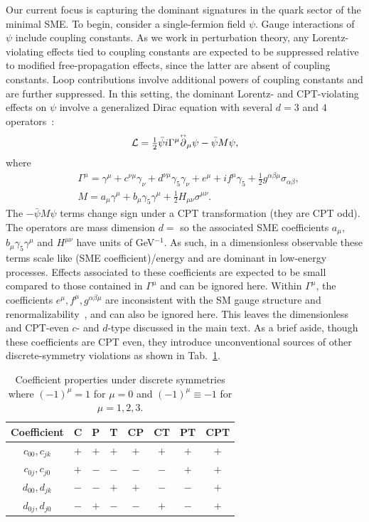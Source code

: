 Our current focus is capturing the dominant 
signatures in the quark sector of the minimal SME.
To begin, consider a single-fermion field $\psi$.
Gauge interactions of $\psi$ include coupling constants.
As we work in perturbation theory, 
any Lorentz-violating effects tied to
coupling constants are expected to be 
suppressed relative to modified free-propagation 
effects, since the latter are absent of coupling 
constants. Loop contributions involve additional
powers of coupling constants and are further
suppressed. In this setting, the dominant
Lorentz- and CPT-violating effects 
on $\psi$ involve a generalized Dirac equation 
with several $d=3$ and $4$ operators~\cite{Colladay:2001wk}:
%
\begin{align}
\label{QEDSME}
\mathcal{L} = \tfrac{1}{2}\bar\psi i\Gamma^\mu \overset{\text{\tiny$\leftrightarrow$}}\partial_\mu\psi - \bar\psi M \psi,
\end{align}
%
where
%
\begin{align}
\label{gammaM}
&\Gamma^\mu = \gamma^\mu + c^{\nu\mu}\gamma_\nu + d^{\nu\mu}\gamma_5\gamma_\nu + e^\mu + if^\mu\gamma_5 + \tfrac{1}{2}g^{\alpha\beta\mu}\sigma_{\alpha\beta}, \\
&M = a_\mu\gamma^\mu + b_\mu \gamma_5\gamma^\mu + \tfrac{1}{2}H_{\mu\nu}\sigma^{\mu\nu}. 
\end{align}
%
The $-\bar\psi M\psi$ terms change sign under a CPT transformation 
(they are CPT odd). The operators are mass dimension $d=$
so the associated SME coefficients $a_\mu$, $b_\mu \gamma_5\gamma^\mu$
and $H^{\mu\nu}$ have units of GeV$^{-1}$. As such, 
in a dimensionless observable these terms scale like 
(SME coefficient)/energy and are dominant in low-energy processes.
Effects associated to these coefficients 
are expected to be small compared to
those contained in $\Gamma^\mu$ and
can be ignored here.
Within $\Gamma^\mu$, the coefficients
$e^\mu, f^\mu, g^{\alpha\beta\mu}$ are inconsistent
with the SM gauge structure and renormalizability~\cite{ck98}, 
and can also be ignored here. This
leaves the dimensionless and 
CPT-even $c$- and $d$-type discussed in the main text.
As a brief aside, though these coefficients are CPT even,
they introduce unconventional sources of other 
discrete-symmetry violations as shown in Tab.~\ref{summarycoeffs}.
%
\begin{table}[ht]
\caption{Coefficient properties under discrete symmetries
where $(-1)^\mu  = 1$ for $\mu = 0$ and $(-1)^\mu \equiv -1$ for $\mu = 1,2,3$.}
\centering 
\begin{tabular}{c c c c c c c c} %
\hline\hline
Coefficient & C & P & T & CP & CT & PT & CPT \\ [0.5ex] %
\hline %
$c_{00}, c_{jk}$ & $+$ & $+$ & $+$ & $+$ & $+$ & $+$ & $+$\\
$c_{0j}, c_{j0}$ & $+$ & $-$ & $-$ & $-$ & $-$ & $+$ & $+$\\
$d_{00}, d_{jk}$ & $-$ & $-$ & $+$ & $+$ & $-$ & $-$ & $+$\\
$d_{0j}, d_{j0}$ & $-$ & $+$ & $-$ & $-$ & $+$ & $-$ & $+$\\[1ex] 
\hline\hline %
\end{tabular}
\label{summarycoeffs}
\end{table}
